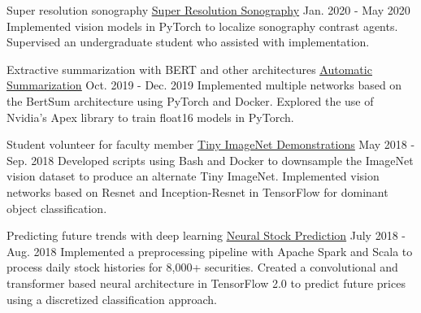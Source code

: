 

\begin{cventries}

  \cventry
  	{Super resolution sonography} %
		{
			\href{https://github.com/TidalPaladin/sr-mb}
      {\underline{Super Resolution Sonography}}
		} %
  	{Jan. 2020 - May 2020} %
    {} %
	{
    Implemented vision models in PyTorch to localize sonography contrast agents.
    Supervised an undergraduate student who assisted with implementation.
	}

  \cventry
  	{Extractive summarization with BERT and other architectures} %
		{
			\href{https://github.com/TidalPaladin/neural-summarizer}
      {\underline{Automatic Summarization}}
		} %
  	{Oct. 2019 - Dec. 2019} %
    {} %
	{
    Implemented multiple networks based on the BertSum architecture using PyTorch 
    and Docker. Explored the use of Nvidia's Apex library to train float16 models 
    in PyTorch.
	}

  \cventry
  	{Student volunteer for faculty member} %
		{
			\href{https://github.com/TidalPaladin/tiny-imagenet-demo}
      {\underline{Tiny ImageNet Demonstrations}}
		} %
  	{May 2018 - Sep. 2018} %
    {} %
	{
		Developed scripts using Bash and Docker to downsample
		the ImageNet vision dataset to produce an alternate Tiny ImageNet.
		Implemented vision networks based on Resnet and
		Inception-Resnet in TensorFlow for dominant object
		classification.
	}

  \cventry
  	{Predicting future trends with deep learning} %
		{
			\href{https://github.com/TidalPaladin/trader}
      {\underline{Neural Stock Prediction}}
		} %
  	{July 2018 - Aug. 2018} %
    {} %
	{
		Implemented a preprocessing pipeline with Apache Spark and Scala
		to process daily stock histories for 8,000+ securities.
		Created a convolutional and transformer based neural architecture
		in TensorFlow 2.0 to predict future prices using a discretized
		classification approach.
	}

\end{cventries}
